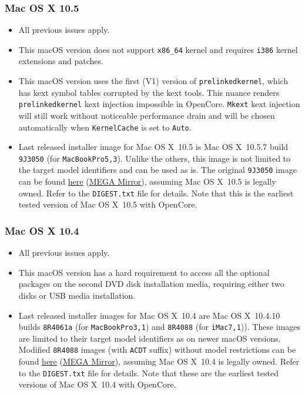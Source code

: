 \documentclass[]{article}
\begin{document}
\subsubsection{Mac OS X 10.5}\label{legacy105}

\begin{itemize}
  \item All previous issues apply.
  \item This macOS version does not support \texttt{x86\_64} kernel
    and requires \texttt{i386} kernel extensions and patches.
  \item This macOS version uses the first (V1) version of \texttt{prelinkedkernel},
    which has kext symbol tables corrupted by the kext tools. This nuance
    renders \texttt{prelinkedkernel} kext injection impossible in OpenCore.
    \texttt{Mkext} kext injection will still work without noticeable
    performance drain and will be chosen automatically when
    \texttt{KernelCache} is set to \texttt{Auto}.
  \item Last released installer image for Mac OS X~10.5 is Mac OS X~10.5.7
    build \texttt{9J3050} (for \texttt{MacBookPro5,3}). Unlike the others,
    this image is not limited to the target model identifiers and can be used
    as is. The original \texttt{9J3050} image can be found
    \href{https://archive.org/details/10.5.7-9-j-3050}{here}
    (\href{https://mega.nz/folder/inRBTarD#zanf7fUbviwz3WHBU5xpCg}{MEGA Mirror}),
    assuming Mac OS X~10.5 is legally owned. Refer to the \texttt{DIGEST.txt} file
    for details. Note that this is the earliest tested
    version of Mac OS X~10.5 with OpenCore.
\end{itemize}

\subsubsection{Mac OS X 10.4}\label{legacy104}

\begin{itemize}
  \item All previous issues apply.
  \item This macOS version has a hard requirement to access all the optional
    packages on the second DVD disk installation media, requiring either two
    disks or USB media installation.
  \item Last released installer images for Mac OS X~10.4 are Mac OS X~10.4.10
    builds \texttt{8R4061a} (for \texttt{MacBookPro3,1}) and
    \texttt{8R4088} (for \texttt{iMac7,1})). These images are limited
    to their target model identifiers as on newer macOS versions.
    Modified \texttt{8R4088} images (with \texttt{ACDT} suffix) without
    model restrictions can be found
    \href{https://archive.org/details/10.4.10-8-r-4088-acdt}{here}
    (\href{https://mega.nz/folder/D3ASzLzA\#7sjYXE2X09f6aGjol\_C7dg}{MEGA Mirror}),
    assuming Mac OS X~10.4 is legally owned. Refer to the \texttt{DIGEST.txt} file
    for details. Note that these are the earliest tested
    versions of Mac OS X~10.4 with OpenCore.
\end{itemize}
\end{document}
